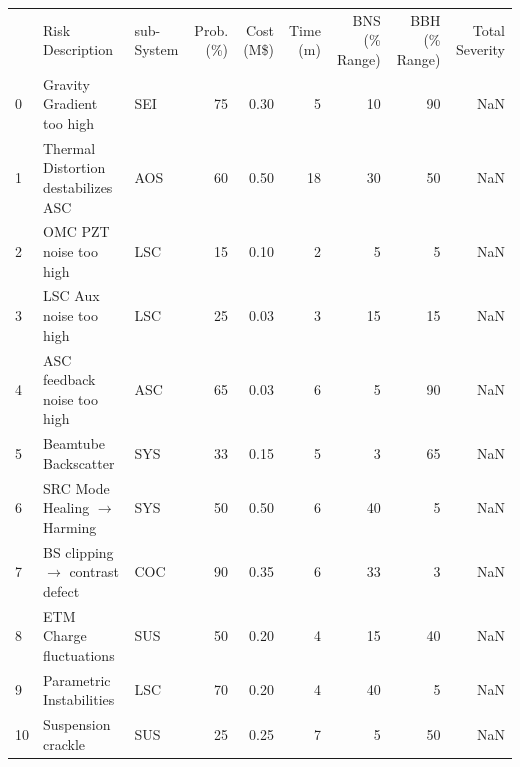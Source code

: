 \begin{table}
\tiny
\begin{tabular}{lllrrrrrr}
\toprule
{} &                     Risk Description & sub-System &  Prob. (\%) &  Cost (M\$) &  Time (m) &  BNS (\% Range) &  BBH (\% Range) &  Total Severity \\
0  &            Gravity Gradient too high &        SEI &               75 &              0.30 &                5 &                    10 &                    90 &             NaN \\
1  &  Thermal Distortion destabilizes ASC &        AOS &               60 &              0.50 &               18 &                    30 &                    50 &             NaN \\
2  &               OMC PZT noise too high &        LSC &               15 &              0.10 &                2 &                     5 &                     5 &             NaN \\
3  &               LSC Aux noise too high &        LSC &               25 &              0.03 &                3 &                    15 &                    15 &             NaN \\
4  &          ASC feedback noise too high &        ASC &               65 &              0.03 &                6 &                     5 &                    90 &             NaN \\
5  &                 Beamtube Backscatter &        SYS &               33 &              0.15 &                5 &                     3 &                    65 &             NaN \\
6  &          SRC Mode Healing $\rightarrow$ Harming &        SYS &               50 &              0.50 &                6 &                    40 &                     5 &             NaN \\
7  &       BS clipping $\rightarrow$ contrast defect &        COC &               90 &              0.35 &                6 &                    33 &                     3 &             NaN \\
8  &              ETM Charge fluctuations &        SUS &               50 &              0.20 &                4 &                    15 &                    40 &             NaN \\
9  &             Parametric Instabilities &        LSC &               70 &              0.20 &                4 &                    40 &                     5 &             NaN \\
10 &                   Suspension crackle &        SUS &               25 &              0.25 &                7 &                     5 &                    50 &             NaN \\

\end{tabular}
\end{table}
